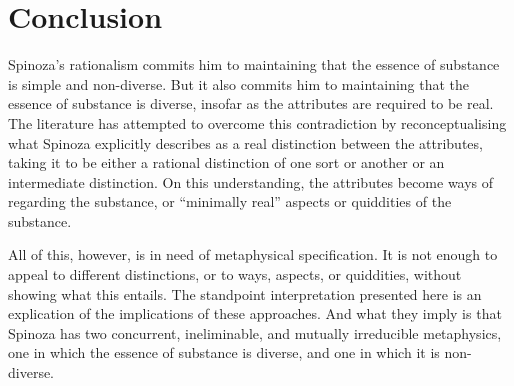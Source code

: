 \documentclass[11pt]{article}
\newcommand{\dash}{\unskip{---}}
\begin{document}
	
	
	
	\section{Conclusion} \label{sec:Conclusion}
	
	Spinoza's rationalism commits him to maintaining that the essence of substance is simple and non-diverse. But it also commits him to maintaining that the essence of substance is diverse, insofar as the attributes are required to be real. The literature has attempted to overcome this contradiction by reconceptualising what Spinoza explicitly describes as a real distinction between the attributes, taking it to be either a rational distinction of one sort or another or an intermediate distinction. On this understanding, the attributes become ways of regarding the substance, or \enquote{minimally real} aspects or quiddities of the substance.
	
	All of this, however, is in need of metaphysical specification. It is not enough to appeal to different distinctions, or to ways, aspects, or quiddities, without showing what this entails. The standpoint interpretation presented here is an explication of the implications of these approaches. And what they imply is that Spinoza has two concurrent, ineliminable, and mutually irreducible metaphysics, one in which the essence of substance is diverse, and one in which it is non-diverse.
	
\end{document}
